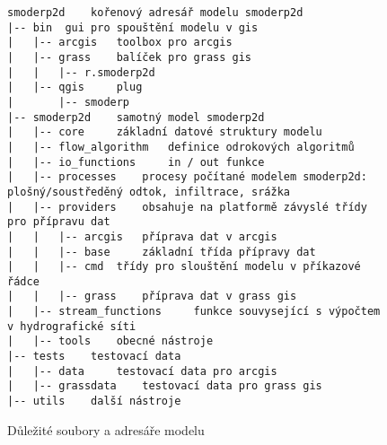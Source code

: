 

\begin{figure}[t!]
  \centering
    \begin{verbatim}
smoderp2d 	 kořenový adresář modelu smoderp2d
|-- bin	 gui pro spouštění modelu v gis
|   |-- arcgis	 toolbox pro arcgis
|   |-- grass	 balíček pro grass gis
|   |   |-- r.smoderp2d
|   |-- qgis	 plug
|       |-- smoderp
|-- smoderp2d	 samotný model smoderp2d
|   |-- core	 základní datové struktury modelu
|   |-- flow_algorithm	 definice odrokových algoritmů
|   |-- io_functions	 in / out funkce
|   |-- processes	 procesy počítané modelem smoderp2d: plošný/soustředěný odtok, infiltrace, srážka
|   |-- providers	 obsahuje na platformě závyslé třídy pro přípravu dat
|   |   |-- arcgis	 příprava dat v arcgis
|   |   |-- base	 základní třída přípravy dat
|   |   |-- cmd	 třídy pro slouštění modelu v příkazové řádce
|   |   |-- grass	 příprava dat v grass gis
|   |-- stream_functions	 funkce souvysející s výpočtem v hydrografické síti
|   |-- tools	 obecné nástroje
|-- tests	 testovací data
|   |-- data	 testovací data pro arcgis
|   |-- grassdata	 testovací data pro grass gis
|-- utils	 další nástroje
\end{verbatim}
  \caption{Důležité soubory a adresáře modelu \smod}
  \label{fig:adresare}
\end{figure}


